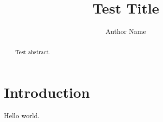 \documentclass[preprint,12pt]{elsarticle}
\begin{document}
\begin{frontmatter}
\title{Test Title}
\author{Author Name}
\begin{abstract}
Test abstract.
\end{abstract}
\end{frontmatter}
\section{Introduction}
Hello world.
\end{document}
